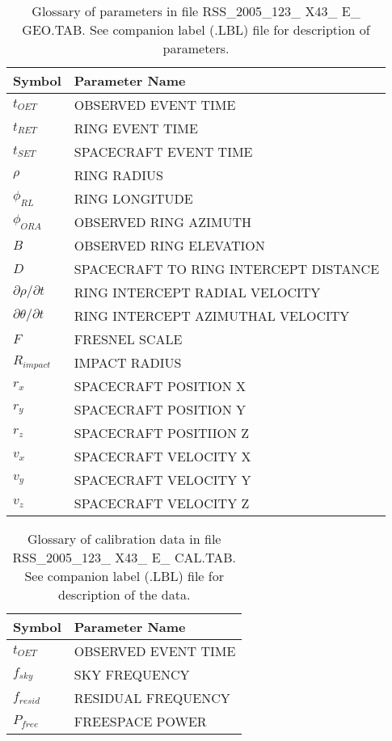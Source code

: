 \documentclass[crop=false,class=book]{standalone}
\begin{document}
\begin{table}[H]
    \centering
    \begin{tabular}{l l} 
        \hline
        Symbol 			& Parameter Name \\ %
        \hline
        $t_{OET}$		& OBSERVED EVENT TIME \\ 
        $t_{RET}$ 		& RING EVENT TIME \\
        $t_{SET}$ 		& SPACECRAFT EVENT TIME \\
        $\rho$	 		& RING RADIUS \\
        $\phi_{RL}$		& RING LONGITUDE \\
        $\phi_{ORA}$	& OBSERVED RING AZIMUTH \\
        $B$				& OBSERVED RING ELEVATION \\
        $D$				& SPACECRAFT TO RING INTERCEPT DISTANCE \\
        $\partial\rho/\partial t$	& RING INTERCEPT RADIAL VELOCITY \\
        $\partial\theta/\partial t$	& RING INTERCEPT AZIMUTHAL VELOCITY \\
        $F$				& FRESNEL SCALE \\
        $R_{impact}$	& IMPACT RADIUS \\
        $r_x$			& SPACECRAFT POSITION X \\
        $r_y$			& SPACECRAFT POSITION Y \\
        $r_z$			& SPACECRAFT POSITIION Z \\
        $v_x$			& SPACECRAFT VELOCITY X \\
        $v_y$			& SPACECRAFT VELOCITY Y \\
        $v_z$			& SPACECRAFT VELOCITY Z \\
        \hline
    \end{tabular}
    \caption[Easy Data Parameters for Geo File]{Glossary of parameters in file RSS\_2005\_123\_ X43\_ E\_ GEO.TAB. See companion label (.LBL) file for description of parameters.}
    \label{tab:easy_data_glossary_of_parameters_in_file_rss_2005_123_x43_e_geo_tab}
\end{table}
\begin{table}[H]
    \centering
    \begin{tabular}{l l}
        \hline
        Symbol			& Parameter Name \\
        \hline
        $t_{OET}$		& OBSERVED EVENT TIME \\
        $f_{sky}$		& SKY FREQUENCY \\
        $f_{resid}$		& RESIDUAL FREQUENCY \\
        $P_{free}$		& FREESPACE POWER \\
        \hline
    \end{tabular}
    \caption[Easy Data Parameters for Cal File]{Glossary of calibration data in file RSS\_2005\_123\_ X43\_ E\_ CAL.TAB. See companion label (.LBL) file for description of the data.}
    \label{tab:easy_data_table_glossary_of_calibration_data_in_file_RSS_2005_123_x45_e_cal_tab}
\end{table}
\end{document}
